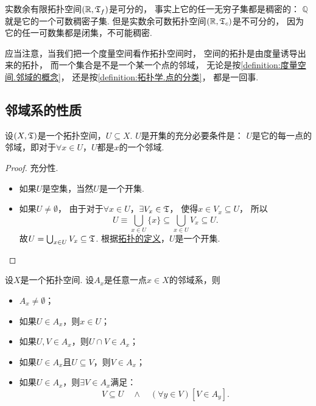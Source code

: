 \begin{example}
实数余有限拓扑空间\((\mathbb{R},\mathfrak T_f)\)是可分的，
事实上它的任一无穷子集都是稠密的：
\(\mathbb{Q}\)就是它的一个可数稠密子集.
但是实数余可数拓扑空间\((\mathbb{R},\mathfrak T_c)\)是不可分的，
因为它的任一可数集都是闭集，不可能稠密.
\end{example}

\begin{remark}
应当注意，当我们把一个度量空间看作拓扑空间时，
空间的拓扑是由度量诱导出来的拓扑，
而一个集合是不是一个某一个点的邻域，
无论是按\cref{definition:度量空间.邻域的概念}，
还是按\cref{definition:拓扑学.点的分类}，
都是一回事.
\end{remark}

\subsection{邻域系的性质}
\begin{theorem}\label{theorem:拓扑学.成为开集的充分必要条件1}
设\((X,\mathfrak T)\)是一个拓扑空间，\(U \subseteq X\).
\(U\)是开集的充分必要条件是：
\(U\)是它的每一点的邻域，即对于\(\forall x \in U\)，\(U\)都是\(x\)的一个邻域.
\begin{proof}
充分性.
\begin{itemize}
	\item 如果\(U\)是空集，当然\(U\)是一个开集.

	\item 如果\(U\neq\emptyset\)，
	由于对于\(\forall x \in U\)，\(\exists V_x \in \mathfrak T\)，
	使得\(x \in V_x \subseteq U\)，
	所以\[
	U \equiv \bigcup_{x \in U} \{ x \}
	\subseteq \bigcup_{x \in U} V_x
	\subseteq U.
	\]
	故\(U = \bigcup_{x \in U} V_x \subseteq \mathfrak T\).
	根据\hyperref[definition:拓扑学.开集公理定义的拓扑空间]{拓扑的定义}，\(U\)是一个开集.
	\qedhere
\end{itemize}
\end{proof}
\end{theorem}

\begin{theorem}\label{theorem:拓扑学.邻域系的基本性质}
设\(X\)是一个拓扑空间.
设\(A_x\)是任意一点\(x \in X\)的邻域系，则
\begin{itemize}
	\item \(A_x \neq \emptyset\)；
	\item 如果\(U \in A_x\)，则\(x \in U\)；
	\item 如果\(U,V \in A_x\)，则\(U \cap V \in A_x\)；
	\item 如果\(U \in A_x\)且\(U \subseteq V\)，则\(V \in A_x\)；
	\item 如果\(U \in A_x\)，则\(\exists V \in A_x\)满足：\[
		V \subseteq U
		\quad\land\quad
		(\forall y \in V)
		[V \in A_y].
	\]
\end{itemize}
\end{theorem}

